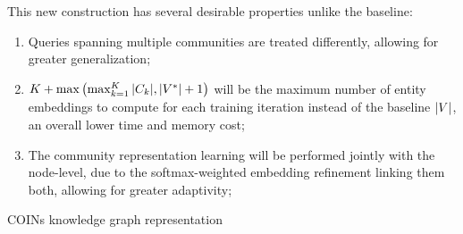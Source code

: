 This new construction has several desirable properties unlike the baseline: 
\begin{enumerate}
    \item Queries spanning multiple communities are treated differently, allowing for greater generalization; 
    \item $K + \max{\mathopen{}\left(\max_{k=1}^{K}{\mathopen{}\left|C_k\right|},\mathopen{}\left|V^{*}\right| + 1\right)}$ will be the maximum number of entity embeddings to compute for each training iteration instead of the baseline $\mathopen{}\left|V\right|$, an overall lower time and memory cost;
    \item The community representation learning will be performed jointly with the node-level, due to the softmax-weighted embedding refinement linking them both, allowing for greater adaptivity;
\end{enumerate}

\begin{algorithm}[H]
\caption{COINs knowledge graph representation}
\label{algorithm:coins}
\begin{algorithmic}[1]
\ELSE
{}
\ENDIF
{}
\end{algorithmic}
\end{algorithm} 

